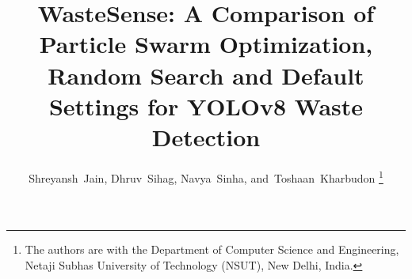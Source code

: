 \documentclass[journal]{IEEEtran}
\begin{document}
\title{WasteSense: A Comparison of Particle Swarm Optimization, Random Search and Default Settings for YOLOv8 Waste Detection}

\author{Shreyansh~Jain, Dhruv~Sihag, Navya~Sinha, and~Toshaan~Kharbudon%
\thanks{The authors are with the Department of Computer Science and Engineering, Netaji Subhas University of Technology (NSUT), New Delhi, India.}}


\maketitle















\end{document}
